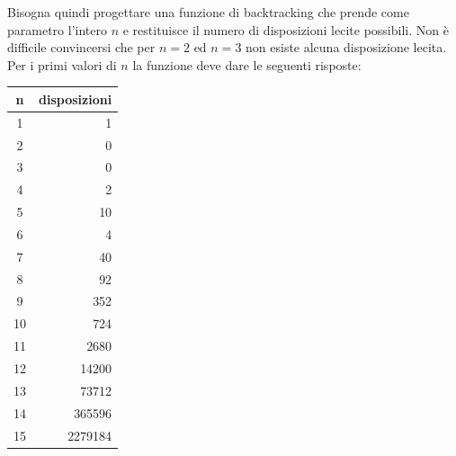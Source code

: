 Bisogna quindi progettare una funzione di backtracking che prende come parametro l’intero $n$ e restituisce il numero di disposizioni lecite possibili. Non è difficile convincersi che per $n = 2$ ed $n = 3$ non esiste alcuna disposizione lecita. Per i primi valori di $n$ la funzione deve dare le seguenti risposte:
\begin{center}
\begin{tabular}{|c|r|}
     \hline
    \textbf{n}&\textbf{disposizioni}\\\hline
    1&1\\\hline
    2&0\\\hline
    3&0\\\hline
    4&2\\\hline
    5&10\\\hline
    6&4\\\hline
    7&40\\\hline
    8&92\\\hline
    9&352\\\hline
    10&724\\\hline
    11&2680\\\hline
    12&14200\\\hline
    13&73712\\\hline
    14&365596\\\hline
    15&2279184\\\hline
\end{tabular}
\end{center}


